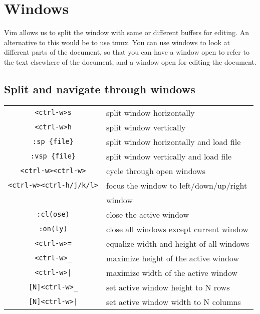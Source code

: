\section{Windows}

Vim allows us to split the window with same or different buffers for editing.
An alternative to this would be to use tmux.
You can use windows to look at different parts of the document, so that you can have a window open to refer to the text elsewhere of the document, and a window open for editing the document.

\subsection{Split and navigate through windows}

\begin{tabular}{c|l}
\verb|<ctrl-w>s|              & split window horizontally\\
\verb|<ctrl-w>h|              & split window vertically\\
\verb|:sp {file}|             & split window horizontally and load file\\
\verb|:vsp {file}|            & split window vertically and load file\\
\verb|<ctrl-w><ctrl-w>|       & cycle through open windows\\
\verb|<ctrl-w><ctrl-h/j/k/l>| & focus the window to left/down/up/right \\
                              & window\\
\verb|:cl(ose)|               & close the active window\\
\verb|:on(ly)|                & close all windows except current window\\
\verb|<ctrl-w>=|              & equalize width and height of all windows\\
\verb|<ctrl-w>_|              & maximize height of the active window\\
\verb=<ctrl-w>|=              & maximize width of the active window\\
\verb|[N]<ctrl-w>_|           & set active window height to N rows\\
\verb=[N]<ctrl-w>|=           & set active window width to N columns\\
\end{tabular}
